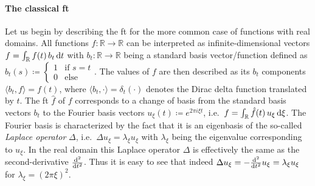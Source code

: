 \paragraph{The classical \acl{ft}}
Let us begin by describing the \ac{ft} for the more common case of functions with real domains.
All functions $f: \mathbb{R} \to \mathbb{R}$ can be interpreted as infinite-dimensional vectors $f = \int_{\mathbb{R}} f(t)\, b_t \mathop{}\!\mathrm{d} t$ with $b_t: \mathbb{R} \to \mathbb{R}$ being a standard basis vector/function defined as $b_t(s) \coloneqq \begin{cases} 1 & \text{if } s = t \\[-6pt] 0 & \text{else} \end{cases}$. %
The values of $f$ are then described as its $b_t$ components $\langle b_t, f \rangle = f(t)$, where $\langle b_t, \cdot \rangle = \delta_t(\cdot)$ denotes the Dirac delta function translated by $t$.
The \acl{ft} $\hat{f}$ of $f$ corresponds to a change of basis from the standard basis vectors $b_t$ to the Fourier basis vectors $u_\xi(t) \coloneqq e^{2 \pi i \xi t}$, i.e.\ $f = \int_{\mathbb{R}} \hat{f}(t)\, u_\xi \mathop{}\!\mathrm{d} \xi$.
The Fourier basis is characterized by the fact that it is an eigenbasis of the so-called \textit{Laplace operator} $\Delta$, i.e.\ $\Delta u_\xi = \lambda_\xi u_\xi$ with $\lambda_\xi$ being the eigenvalue corresponding to $u_\xi$.
In the real domain this Laplace operator $\Delta$ is effectively the same as the second-derivative $\frac{\mathop{}\!\mathrm{d}^2}{\mathop{}\!\mathrm{d} t^2}$.
Thus it is easy to see that indeed $\Delta u_\xi = -\frac{\mathop{}\!\mathrm{d}^2}{\mathop{}\!\mathrm{d} t^2} u_\xi = \lambda_\xi u_\xi$ for $\lambda_\xi = {(2 \pi \xi)}^2$.

